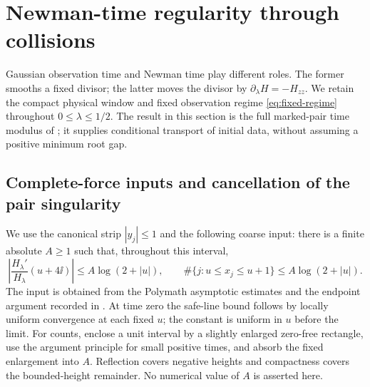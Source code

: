 \section{Newman-time regularity through collisions}\label{sec:newman-time}

Gaussian observation time and Newman time play different roles.
The former smooths a fixed divisor; the latter moves the divisor by
$\partial_\lambda H=-H_{zz}$. We retain the compact physical window
and fixed observation regime \eqref{eq:fixed-regime} throughout
$0\le\lambda\le1/2$. The result in this section is the full marked-pair
time modulus of \cite{OCTime,OCTimeReview}; it supplies conditional
transport of initial data, without assuming a positive minimum root gap.

\subsection{Complete-force inputs and cancellation of the pair singularity}

We use the canonical strip $|y_j|\le1$ and the following coarse input:
there is a finite absolute $A\ge1$ such that, throughout this interval,
\begin{equation}\label{eq:time-input}
 \left|\frac{H_\lambda'}{H_\lambda}(u+4\ii)\right|
      \le A\log(2+|u|),\qquad
 \#\{j:u\le x_j\le u+1\}\le A\log(2+|u|).
\end{equation}
The input is obtained from the Polymath asymptotic estimates and the
endpoint argument recorded in \cite{PolymathHeat2019,ParentModulus}.
At time zero the safe-line bound follows by locally uniform convergence
at each fixed $u$; the constant is uniform in $u$ before the limit.
For counts, enclose a unit interval by a slightly enlarged zero-free
rectangle, use the argument principle for small positive times, and
absorb the fixed enlargement into $A$. Reflection covers negative
heights and compactness covers the bounded-height remainder. No
numerical value of $A$ is asserted here.

